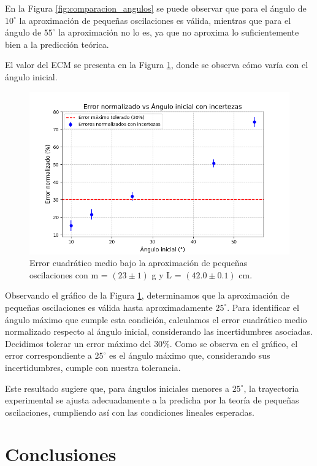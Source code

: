 \documentclass[12pt,a4]{article}
\begin{document}
En la Figura \ref{fig:comparacion_angulos} se puede observar que para el ángulo de $10^\circ$ la aproximación de pequeñas oscilaciones es válida, mientras que para el ángulo de $55^\circ$ la aproximación no lo es, ya que no aproxima lo suficientemente bien a la predicción teórica.

El valor del ECM se presenta en la Figura \ref{fig:pequeñas_oscilaciones}, donde se observa cómo varía con el ángulo inicial.

\begin{figure}[H]
    \centering
    \includegraphics[width=0.6\linewidth]{errores_normalizados_incertezas.png}
    \caption{Error cuadrático medio bajo la aproximación de pequeñas oscilaciones con m = $(23\pm1)$ g y L = $(42.0\pm0.1)$ cm.}
    \label{fig:pequeñas_oscilaciones}
\end{figure}
Observando el gráfico de la Figura \ref{fig:pequeñas_oscilaciones}, determinamos que la aproximación de pequeñas oscilaciones es válida hasta aproximadamente \(25^\circ\). Para identificar el ángulo máximo que cumple esta condición, calculamos el error cuadrático medio normalizado respecto al ángulo inicial, considerando las incertidumbres asociadas. Decidimos tolerar un error máximo del \(30\%\). Como se observa en el gráfico, el error correspondiente a \(25^\circ\) es el ángulo máximo que, considerando sus incertidumbres, cumple con nuestra tolerancia.

Este resultado sugiere que, para ángulos iniciales menores a \(25^\circ\), la trayectoria experimental se ajusta adecuadamente a la predicha por la teoría de pequeñas oscilaciones, cumpliendo así con las condiciones lineales esperadas.

\section{Conclusiones}
\end{document}
